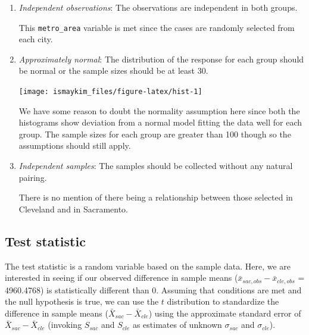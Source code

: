 \documentclass[]{tufte-book}
\newenvironment{Shaded}{\begin{snugshade}}{\end{snugshade}}
\newcommand{\KeywordTok}[1]{\textcolor[rgb]{0.13,0.29,0.53}{\textbf{{#1}}}}
\newcommand{\DataTypeTok}[1]{\textcolor[rgb]{0.13,0.29,0.53}{{#1}}}
\newcommand{\DecValTok}[1]{\textcolor[rgb]{0.00,0.00,0.81}{{#1}}}
\newcommand{\StringTok}[1]{\textcolor[rgb]{0.31,0.60,0.02}{{#1}}}
\newcommand{\NormalTok}[1]{{#1}}
\begin{document}
\begin{enumerate}
\def\labelenumi{\arabic{enumi}.}
\item
  \emph{Independent observations}: The observations are independent in
  both groups.

  This \texttt{metro\_area} variable is met since the cases are randomly
  selected from each city.
\item
  \emph{Approximately normal}: The distribution of the response for each
  group should be normal or the sample sizes should be at least 30.

\begin{Shaded}
\end{Shaded}

  \begin{center}\texttt{[image: ismaykim\_files/figure-latex/hist-1]} \end{center}

  We have some reason to doubt the normality assumption here since both
  the histograms show deviation from a normal model fitting the data
  well for each group. The sample sizes for each group are greater than
  100 though so the assumptions should still apply.
\item
  \emph{Independent samples}: The samples should be collected without
  any natural pairing.

  There is no mention of there being a relationship between those
  selected in Cleveland and in Sacramento.
\end{enumerate}

\subsection{Test statistic}\label{test-statistic-3}

The test statistic is a random variable based on the sample data. Here,
we are interested in seeing if our observed difference in sample means
(\(\bar{x}_{sac, obs} - \bar{x}_{cle, obs}\) = 4960.4768) is
statistically different than 0. Assuming that conditions are met and the
null hypothesis is true, we can use the \(t\) distribution to
standardize the difference in sample means
(\(\bar{X}_{sac} - \bar{X}_{cle}\)) using the approximate standard error
of \(\bar{X}_{sac} - \bar{X}_{cle}\) (invoking \(S_{sac}\) and
\(S_{cle}\) as estimates of unknown \(\sigma_{sac}\) and
\(\sigma_{cle}\)).
\end{document}
